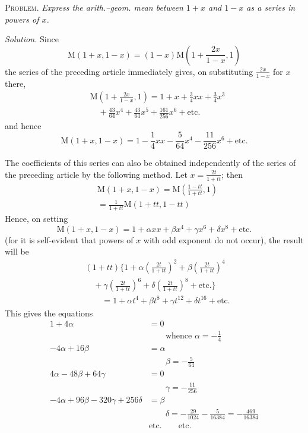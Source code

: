 
\textsc{Problem.} \textit{Express the arith.–geom. mean between \(1+x\) and \(1-x\) as a series in powers of \(x\).}

\textit{Solution.} Since
\[
\mathrm{M}(1+x,1-x)=(1-x)\mathrm{M}(1+\frac{2x}{1-x},1)
\]
the series of the preceding article immediately gives, on substituting \(\frac{2x}{1-x}\) for \(x\) there,
\[
\begin{aligned}&\mathrm{M}(1+\frac{2x}{1-x},1)=1+x+\frac34xx+\frac34x^3\\&\quad+\frac{43}{64}x^4+\frac{43}{64}x^5+\frac{161}{256}x^6+\text{etc.}\end{aligned}
\]
and hence
\[
\mathrm{M}(1+x,1-x)=1-\frac14xx-\frac5{64}x^4-\frac{11}{256}x^6+\text{etc.}
\]

The coefficients of this series can also be obtained independently of the series of the preceding article by the following method. Let \(x=\frac{2t}{1+tt}\); then
\[
\begin{aligned}&\mathrm{M}(1+x,1-x)=\mathrm{M}(\frac{1-tt}{1+tt},1)\\&=\frac1{1+tt}\mathrm{M}(1+tt,1-tt)\end{aligned}
\]
Hence, on setting
\[
\mathrm{M}(1+x,1-x)=1+\alpha xx+\beta x^4+\gamma x^6+\delta x^8+\text{etc.}
\]
(for it is self-evident that powers of \(x\) with odd exponent do not occur), the result will be
\[
\begin{aligned}
&(1+tt)\{1+\alpha(\frac{2t}{1+tt})^2+\beta(\frac{2t}{1+tt})^4\\&\quad+\gamma(\frac{2t}{1+tt})^6+\delta(\frac{2t}{1+tt})^8+\text{etc.}\}\\[6pt]
&\qquad=1+\alpha t^4+\beta t^8+\gamma t^{12}+\delta t^{16}+\text{etc.}
\end{aligned}
\]
This gives the equations
\[
\begin{aligned}
1+4\alpha&=0\\&\qquad\text{whence }\alpha=-\frac14\\[6pt]
-4\alpha+16\beta&=\alpha\\&\qquad\beta=-\frac5{64}\\[6pt]
4\alpha-48\beta+64\gamma&=0\\&\qquad\gamma=-\frac{11}{256}\\[6pt]
-4\alpha+96\beta-320\gamma+256\delta&=\beta\\&\qquad\delta=-\frac{29}{1024}-\frac5{16384}=-\frac{469}{16384}\\[6pt]
&\text{etc.}\qquad\text{etc.}
\end{aligned}
\]
